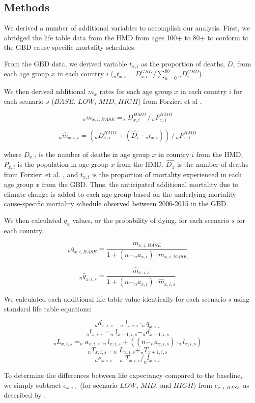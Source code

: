 \documentclass[12pt,]{article}
\begin{document}
\subsection{Methods}\label{methods-1}

We derived a number of additional variables to accomplish our analysis.
First, we abridged the life table data from the HMD from ages 100+ to
80+ to conform to the GBD cause-specific mortality schedules.

From the GBD data, we derived variable \(t_{x,i}\) as the proportion of
deaths, \(D\), from each age group \(x\) in each country \(i\)
(\(_nt_{x,i}=D_{x,i}^{GBD}/\sum_{\alpha=0}^{80}{_nD_i^{GBD}}\)).

We then derived additional \(m_x\) rates for each age group \(x\) in
each country \(i\) for each scenario \(s\) (\(BASE\), \(LOW\), \(MID\),
\(HIGH\)) from Forzieri et al \citep{forzieri2017increasing}.

\begin{equation}
_nm_{x,i,BASE} = _nD_{x,i}^{HMD} \,/\, _nP_{x,i}^{HMD}
\end{equation}

\begin{equation}
_n\hat{m}_{x,i,s} = (_nD_{x,i}^{HMD} + (\hat{D_i} \,\cdot\, _nt_{x,i}) ) \,/\, _nP_{x,i}^{HMD}
\end{equation}

where \(D_{x,i}\) is the number of deaths in age group \(x\) in country
\(i\) from the HMD, \(P_{x,i}\) is the population in age group \(x\)
from the HMD, \(\hat{D_x}\) is the number of deaths from Forzieri et al.
\citep{forzieri2017increasing}, and \(t_{x,i}\) is the proportion of
mortality experienced in each age group \(x\) from the GBD. Thus, the
anticipated additional mortality due to climate change is added to each
age group based on the underlying mortality cause-specific mortality
schedule observed between 2006-2015 in the GBD.

We then calculated \(q_x\) values, or the probability of dying, for each
scenario \(s\) for each country.

\begin{equation}
_nq_{x,i,BASE} = \frac{m_{x,i,BASE}}{1+(n-_na_{x,i}) \cdot m_{x,i,BASE}}
\end{equation}

\begin{equation}
_n\hat{q}_{x,i,s} = \frac{\hat{m}_{x,i,s}}{1+(n-_na_{x,i}) \cdot \hat{m}_{x,i,s}}
\end{equation}

We calculated each additional life table value identically for each
scenario \(s\) using standard life table equations:

\[_nd_{x,i,s} = _nl_{x,i,s} \cdot _nq_{x,i,s}\]
\[_nl_{x,i,s} = _nl_{x-1,i,s} - _nd_{x-1,i,s}\]
\[_nL_{x,i,s} = _na_{x,i,s} \cdot _nl_{x,i,s} + ((n-_na_{x,i,s}) \cdot _nl_{x,i,s})\]
\[_nT_{x,i,s} = _nL_{x,i,s} + _nT_{x+1,i,s}\]
\[_ne_{x,i,s} = _nT_{x,i,s} / _nl_{x,i,s}\]

To determine the differences between life expectancy compared to the
baseline, we simply subtract \(e_{x,i,s}\) (for scenario \(LOW\),
\(MID\), and \(HIGH\)) from \(e_{x,i,BASE}\) as described by
\citep{beltran2008integrated}.
\newpage
\singlespacing 

\end{document}

